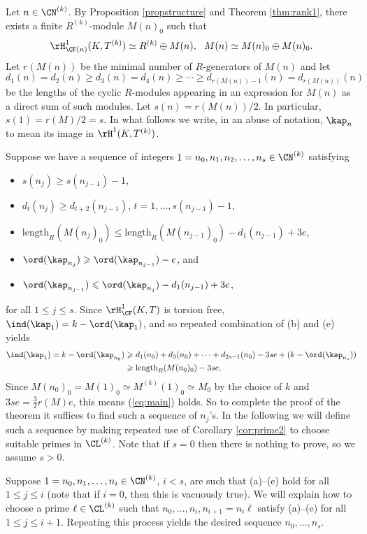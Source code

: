 Let $n\in \CN^{(k)}$.
By Proposition \ref{propstructure} and Theorem \ref{thm:rank1}, there exists a finite $R^{(k)}$-module $M(n)_0$ such that
$$
\rH^1_{\CF(n)}(K,T^{(k)}) \simeq R^{(k)}\oplus M(n), \ \ M(n) \simeq M(n)_0\oplus M(n)_0.
$$
Let $r(M(n))$ be the minimal number of $R$-generators of $M(n)$ and let
\[
d_1(n)= d_2(n)\geqslant d_3(n)= d_4(n)\geqslant\cdots \geqslant d_{r(M(n))-1}(n)= d_{r(M(n))}(n)
\]
be the lengths of the cyclic $R$-modules appearing in an expression
for $M(n)$ as a direct sum of such modules.
Let $s(n) = r(M(n))/2$. In particular, $s(1) = r(M)/2 = s$.
In what follows we write, in an abuse of notation, $\kap_n$ to mean its image
in $\rH^1(K,T^{(k)})$.

Suppose we have a sequence of integers $1=n_0,n_1,n_2,\dots,n_s\in \CN^{(k)}$ satisfying
\begin{itemize}
\item[(a)] $s(n_j)\geqslant s(n_{j-1})-1$,
\item[(b)] $d_t(n_j) \geqslant d_{t+2}(n_{j-1})$, $t=1,\dots,s(n_{j-1})-1$,
\item[(c)] $\mathrm{length}_R(M(n_j)_0) \leqslant \mathrm{length}_R(M(n_{j-1})_0) -
d_1(n_{j-1}) + 3e$,
\item[(d)] $\ord(\kap_{n_j}) \geqslant \ord(\kap_{n_{j-1}}) - e$, and
\item[(e)] $\ord(\kap_{n_{j-1}}) \leqslant \ord(\kap_{n_{j}}) - d_1(n_{j-1}) + 3e$,
\end{itemize}
for all $1\leqslant j\leqslant s$.
Since $\rH^1_{\CF}(K,T)$ is torsion free, $\ind(\kap_1) = k - \ord(\kap_1)$, and so
repeated combination of (b) and (e) yields
\begin{align*}
\ind(\kap_1) = k -\ord(\kap_{n_0}) &\geqslant d_1(n_0) + d_3(n_0) + \cdots + d_{2s-1}(n_0) - 3se
+ (k-\ord(\kap_{n_s}))\\
& \geqslant \mathrm{length}_R(M(n_0)_0) - 3se.
\end{align*}
Since $M(n_0)_0 = M(1)_0 \simeq M^{(k)}(1)_0\simeq M_0$ by the choice of $k$ and $3se = \frac{3}{2}r(M)e$, this means (\ref{eq:main}) holds.
So to complete the proof of the theorem it suffices to find such a sequence of $n_j$'s.
In the following we will define such a sequence by making repeated use of Corollary \ref{cor:prime2}
to choose suitable primes in $\CL^{(k)}$. Note that if $s=0$ then there is nothing to prove, so we assume $s>0$.

Suppose $1=n_0,n_1,\dots,n_i \in \CN^{(k)}$, $i<s$, are such that (a)--(e) hold for all $1\leqslant j\leqslant i$ (note that if $i=0$, then this is
vacuously true).  We will explain how to choose a prime $\ell\in \CL^{(k)}$ such that $n_0,\dots,n_i,n_{i+1}=n_i\ell$
satisfy (a)--(e) for all $1\leqslant j\leqslant i+1$. Repeating this process yields the desired sequence $n_0,\dots,n_s$.

